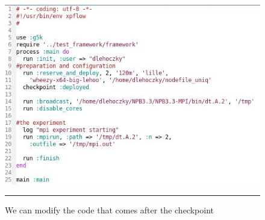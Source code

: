 \begin{figure}[htbp]
  \centering
    \includegraphics[scale=0.7]{./Figures/checkpoint2.jpg}
    \rule{35em}{0.5pt}
  \caption[Checkpoint example]{We can modify the code that comes after
  the checkpoint}
  \label{fig:checkpoint2}
\end{figure}
